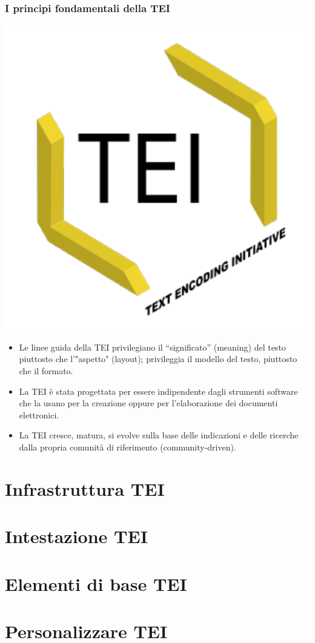 \documentclass{beamer}
\begin{document}
\begin{frame}
	\frametitle{I principi fondamentali della TEI}
	\addtocounter{nframe}{1}
    
    \begin{center}
	    \includegraphics[width=.2\textwidth]{../imgs/tei-r.pdf}
	\end{center}

    \begin{itemize}
        
        \item<1-> Le linee guida della TEI privilegiano il ``significato'' (meaning) del testo piuttosto che l'"aspetto" (layout); privileggia il modello del testo, piuttosto che il formato.
          
        \item<2-> La TEI è stata progettata per essere indipendente dagli strumenti software che la usano per la creazione oppure per l'elaborazione dei documenti elettronici.

        \item<3-> La TEI cresce, matura, si evolve sulla base delle indicazioni e delle ricerche dalla propria comunità di riferimento (community-driven).
           
    \end{itemize}
    
\end{frame}

\section{Infrastruttura TEI}


\section{Intestazione TEI}


\section{Elementi di base TEI}


\section{Personalizzare TEI}


%
\end{document}
